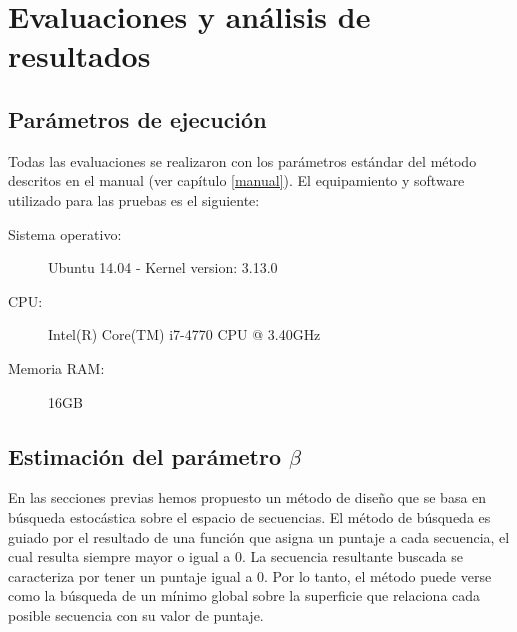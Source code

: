 \chapter{Evaluaciones y análisis de resultados}
\label{results}

\section{Parámetros de ejecución}

Todas las evaluaciones se realizaron con los parámetros estándar del método descritos en el manual (ver capítulo \ref{manual}).
El equipamiento y software utilizado para las pruebas es el siguiente:


\begin{center}
\begin{description}
 \item[Sistema operativo:] Ubuntu 14.04 - Kernel version: 3.13.0
\item[CPU:] Intel(R) Core(TM) i7-4770 CPU @ 3.40GHz
\item[Memoria RAM:] 16GB
\end{description}
\end{center}



\section{Estimación del parámetro $\beta$}\label{betaResults}

En las secciones previas hemos propuesto un método de diseño que se basa en búsqueda estocástica sobre el espacio de secuencias.
El método de búsqueda es guiado por el resultado de una función que asigna un puntaje a cada secuencia, el cual resulta siempre mayor o igual a 0.
La secuencia resultante buscada se caracteriza por tener un puntaje igual a 0. Por lo tanto, el método puede verse como la búsqueda de un mínimo global sobre la superficie
que relaciona cada posible secuencia con su valor de puntaje.

